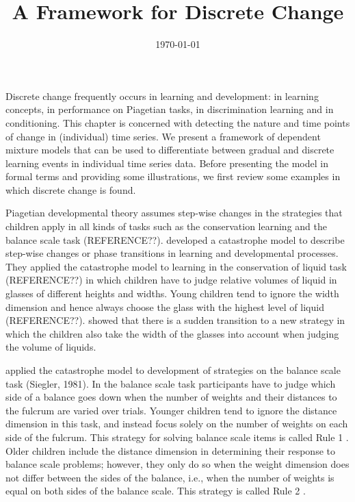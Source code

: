 \documentclass[a4paper,12pt,man,english]{apa} %
\title{A Framework for Discrete Change}
\date{\today}
\newcommand{\citet}{\citeA}
\begin{document}
\maketitle

Discrete change frequently occurs in learning and development: in
learning concepts, in performance on Piagetian tasks, in
discrimination learning and in conditioning.  This chapter is
concerned with detecting the nature and time points of change in (individual)
time series.  We present a framework of dependent mixture models that can
be used to differentiate between gradual and discrete learning events
in individual time series data.  Before presenting the model in formal
terms and providing some illustrations, we first review some examples
in which discrete change is found.

Piagetian developmental theory assumes step-wise changes in the
strategies that children apply in all kinds of tasks such as the
conservation learning and the balance scale task (REFERENCE??).
\citet{Maas1992} developed a catastrophe model to describe step-wise
changes or phase transitions in learning and developmental processes.
They applied the catastrophe model to learning in the conservation of
liquid task (REFERENCE??)  in which children have to judge relative
volumes of liquid in glasses of different heights and widths.  Young
children tend to ignore the width dimension and hence always choose
the glass with the highest level of liquid (REFERENCE??).
\citet{Maas1992} showed that there is a sudden transition to a new
strategy in which the children also take the width of the glasses into
account when judging the volume of liquids.

\citet{Jansen2001} applied the catastrophe model to
development of strategies on the balance scale task (Siegler, 1981).
In the balance scale task participants have to judge which side of a
balance goes down when the number of weights and their distances to
the fulcrum are varied over trials.  Younger children tend to ignore
the distance dimension in this task, and instead focus solely on the
number of weights on each side of the fulcrum.  This strategy for
solving balance scale items is called Rule 1 \cite{Siegler1981}.  Older
children include the distance dimension in determining their response
to balance scale problems; however, they only do so when the weight
dimension does not differ between the sides of the balance, i.e., when
the number of weights is equal on both sides of the balance scale.
This strategy is called Rule 2 \cite{Siegler1981}.
\end{document}
